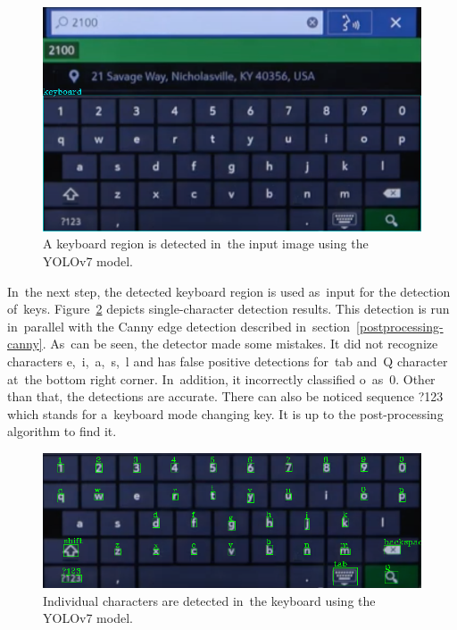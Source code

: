 \begin{figure}[hbt]
    \includegraphics[width=1\textwidth]{img/design/demo-detection-keyboard.png}
    \caption{A keyboard region is detected in~the input image using the YOLOv7 model.}
    \label{demo-detection-keyboard}
\end{figure}

In~the next step, the detected keyboard region is used as~input for the detection of~keys. Figure~\ref{demo-detection-chars} depicts single-character detection results. This detection is run in~parallel with the Canny edge detection described in~section~\ref{postprocessing-canny}. As~can be seen, the detector made some mistakes. It did not recognize characters \hbox{e, i, a, s, l} and has false positive detections for~tab and~Q character at~the bottom right corner. In~addition, it incorrectly classified o~as~0. Other than that, the detections are accurate. There can also be noticed sequence ?123 which stands for a~keyboard mode changing key. It is up to the post-processing algorithm to find it.

\begin{figure}[!hbt]
    \includegraphics[width=1\textwidth]{img/design/demo-detection-chars.png}
    \caption{Individual characters are detected in~the keyboard using the YOLOv7 model.}
    \label{demo-detection-chars}
\end{figure}

